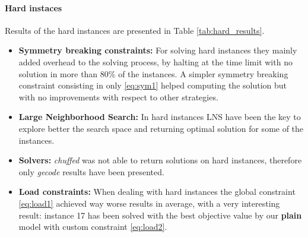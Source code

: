\paragraph{Hard instaces} Results of the hard instances are presented in Table \ref{tab:hard_results}.
\begin{itemize}
    \item \textbf{Symmetry breaking constraints:} For solving hard instances they mainly added overhead to the solving process, by halting at the time limit with no solution in more than $80$\% of the instances. A simpler symmetry breaking constraint consisting in only \eqref{eq:sym1} helped computing the solution but with no improvements with respect to other strategies.
    \item \textbf{Large Neighborhood Search:} In hard instances LNS have been the key to explore better the search space and returning optimal solution for some of the instances.
    \item \textbf{Solvers:} \textit{chuffed} was not able to return solutions on hard instances, therefore only \textit{gecode} results have been presented.
    \item \textbf{Load constraints:} When dealing with hard instances the global constraint \eqref{eq:load1} achieved way worse results in average, with a very interesting result: instance 17 has been solved with the best objective value by our \textbf{plain} model with custom constraint \eqref{eq:load2}.  
\end{itemize}

